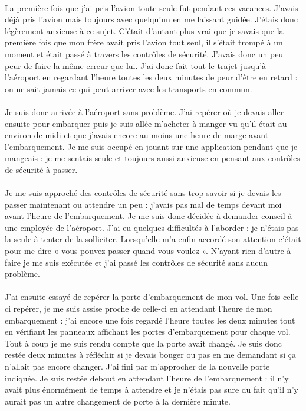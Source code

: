 \paragraph{}
La première fois que j’ai pris l’avion toute seule fut pendant ces vacances. J’avais déjà pris l’avion mais toujours avec quelqu’un en me laissant guidée. J’étais donc légèrement anxieuse à ce sujet. C’était d’autant plus vrai que je savais que la première fois que mon frère avait pris l’avion tout seul, il s’était trompé à un moment et était passé à travers les contrôles de sécurité. J’avais donc un peu peur de faire la même erreur que lui. J’ai donc fait tout le trajet jusqu’à l’aéroport en regardant l’heure toutes les deux minutes de peur d’être en retard : on ne sait jamais ce qui peut arriver avec les transports en commun. 
\paragraph{}
Je suis donc arrivée à l’aéroport sans problème. J’ai repérer où je devais aller ensuite pour embarquer puis je suis allée m’acheter à manger vu qu’il était au environ de midi et que j’avais encore au moins une heure de marge avant l’embarquement. Je me suis occupé en jouant sur une application pendant que je mangeais : je me sentais seule et toujours aussi anxieuse en pensant aux contrôles de sécurité à passer. 
\paragraph{}
Je me suis approché des contrôles de sécurité sans trop savoir si je devais les passer maintenant ou attendre un peu : j’avais pas mal de temps devant moi avant l’heure de l’embarquement. Je me suis donc décidée à demander conseil à une employée de l’aéroport. J’ai eu quelques difficultés à l’aborder : je n’étais pas la seule à tenter de la solliciter. Lorsqu’elle m’a enfin accordé son attention c’était pour me dire « vous pouvez passer quand vous voulez ». N’ayant rien d’autre à faire je me suis exécutée et j’ai passé les contrôles de sécurité sans aucun problème.
\paragraph{}
J’ai ensuite essayé de repérer la porte d’embarquement de mon vol. Une fois celle-ci repérer, je me suis assise proche de celle-ci en attendant l’heure de mon embarquement : j’ai encore une fois regardé l’heure toutes les deux minutes tout en vérifiant les panneaux affichant les portes d’embarquement pour chaque vol. Tout à coup je me suis rendu compte que la porte avait changé. Je suis donc restée deux minutes à réfléchir si je devais bouger ou pas en me demandant si ça n’allait pas encore changer. J’ai fini par m’approcher de la nouvelle porte indiquée. Je suis restée debout en attendant l’heure de l’embarquement : il n’y avait plus énormément de temps à attendre et je n’étais pas sure du fait qu’il n’y aurait pas un autre changement de porte à la dernière minute. 
